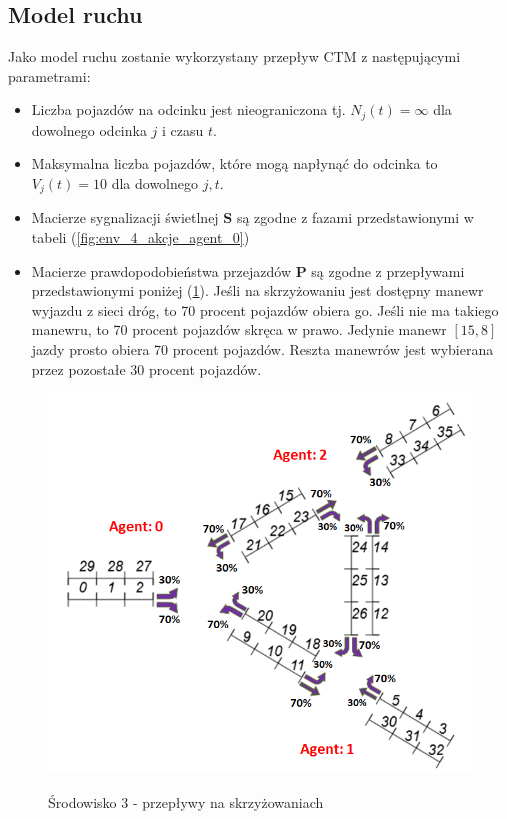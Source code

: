 \documentclass[12pt]{book}
\theoremstyle{plain}
\newcommand{\myref}[1]{(\ref{#1})}
\begin{document}
\subsection{Model ruchu}
Jako model ruchu zostanie wykorzystany przepływ CTM z następującymi parametrami:
\begin{itemize}
	\item Liczba pojazdów na odcinku jest nieograniczona tj. $N_j(t)=\infty$ dla dowolnego odcinka $j$ i czasu $t$.
	\item Maksymalna liczba pojazdów, które mogą napłynąć do odcinka to $V_j(t)=10$ dla dowolnego $j,t$.
	\item Macierze sygnalizacji świetlnej $\textbf{S}$ są zgodne z fazami przedstawionymi w tabeli \myref{fig:env_4_akcje_agent_0}
	\item Macierze prawdopodobieństwa przejazdów $\textbf{P}$ są zgodne z przepływami przedstawionymi poniżej \myref{fig:srodowisko_3_przeplywy}. Jeśli na skrzyżowaniu jest dostępny manewr wyjazdu z sieci dróg, to 70 procent pojazdów obiera go. Jeśli nie ma takiego manewru, to 70 procent pojazdów skręca w prawo. Jedynie manewr $[15,8]$ jazdy prosto obiera 70 procent pojazdów. Reszta manewrów jest wybierana przez pozostałe 30 procent pojazdów. 
\end{itemize}
\begin{figure}[H]
	\centering
	\includegraphics[width=14cm]{images/srodowisko_3_przeplywy_italic}
	\label{fig:srodowisko_3_przeplywy}
	\caption{Środowisko 3 - przepływy na skrzyżowaniach}
\end{figure}
\end{document}

